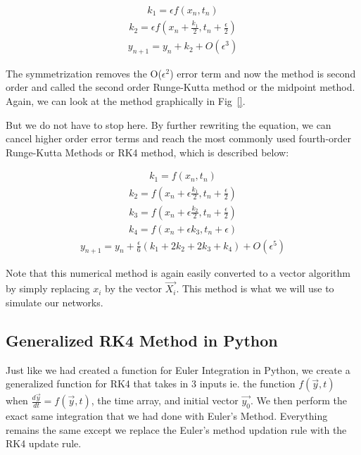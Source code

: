 \documentclass[10pt,letterpaper]{article}
\begin{document}
\begin{eqnarray}k_1=\epsilon f(x_n,t_n)\end{eqnarray}
\begin{eqnarray}k_2=\epsilon f(x_n+\frac{k_1}{2},t_n+\frac{\epsilon}{2})\end{eqnarray}
\begin{eqnarray}y_{n+1}=y_n+k_2+O(\epsilon^3)\end{eqnarray}


The symmetrization removes the O($\epsilon^2$) error term and now the method is second order and called the second order Runge-Kutta method or the midpoint method. Again, we can look at the method graphically in Fig~\ref{}.

But we do not have to stop here. By further rewriting the equation, we can cancel higher order error terms and reach the most commonly used fourth-order Runge-Kutta Methods or RK4 method, which is described below:

\begin{eqnarray}k_1=f(x_n,t_n)\end{eqnarray}
\begin{eqnarray}k_2=f(x_n+\epsilon\frac{k_1}{2},t_n+\frac{\epsilon}{2})\end{eqnarray}
\begin{eqnarray}k_3=f(x_n+\epsilon\frac{k_2}{2},t_n+\frac{\epsilon}{2})\end{eqnarray}
\begin{eqnarray}k_4=f(x_n+\epsilon k_3,t_n+\epsilon)\end{eqnarray}
\begin{eqnarray}y_{n+1}=y_n+\frac{\epsilon}{6}(k_1+2 k_2+2 k_3+k_4)+O(\epsilon^5)\end{eqnarray}

Note that this numerical method is again easily converted to a vector algorithm by simply replacing $x_i$ by the vector $\vec{X_i}$. This method is what we will use to simulate our networks.


\subsection*{Generalized RK4 Method in Python}

Just like we had created a function for Euler Integration in Python, we create a generalized function for RK4 that takes in 3 inputs ie. the function $f(\vec{y},t)$ when $\frac{d\vec{y}}{dt}=f(\vec{y},t)$, the time array, and initial vector $\vec{y_0}$. We then perform the exact same integration that we had done with Euler's Method. Everything remains the same except we replace the Euler's method updation rule with the RK4 update rule.
\end{document}
